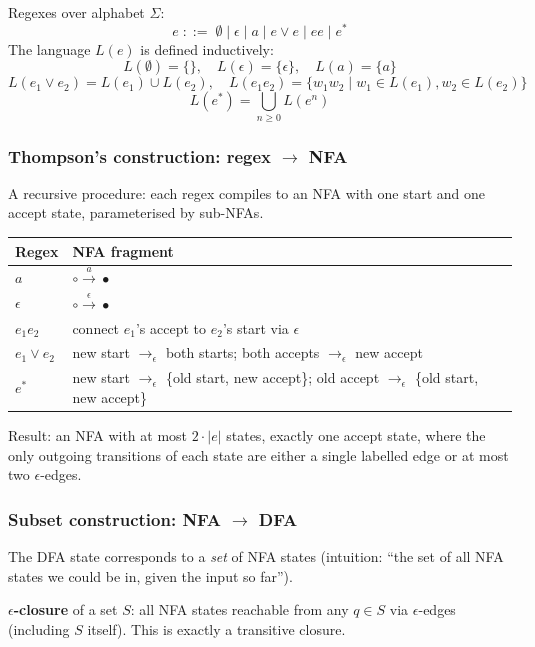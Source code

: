 \documentclass[11pt,a4paper]{article}
\begin{document}
Regexes over alphabet $\Sigma$:
$$e \;::=\; \emptyset \mid \epsilon \mid a \mid e \vee e \mid ee \mid e^*$$
The language $L(e)$ is defined inductively:
$$L(\emptyset) = \{\}, \quad L(\epsilon) = \{\epsilon\}, \quad L(a) = \{a\}$$
$$L(e_1 \vee e_2) = L(e_1) \cup L(e_2), \quad L(e_1 e_2) = \{w_1 w_2 \mid w_1 \in L(e_1), w_2 \in L(e_2)\}$$
$$L(e^*) = \bigcup_{n \geq 0} L(e^n)$$

\subsubsection*{Thompson's construction: regex $\to$ NFA}

A recursive procedure: each regex compiles to an NFA with one start and one accept state, parameterised by sub-NFAs.

\begin{center}
\begin{tabular}{ll}
\hline
Regex & NFA fragment \\
\hline
$a$           & $\circ \xrightarrow{a} \bullet$ \\
$\epsilon$    & $\circ \xrightarrow{\epsilon} \bullet$ \\
$e_1 e_2$     & connect $e_1$'s accept to $e_2$'s start via $\epsilon$ \\
$e_1 \vee e_2$ & new start $\to_\epsilon$ both starts; both accepts $\to_\epsilon$ new accept \\
$e^*$         & new start $\to_\epsilon$ \{old start, new accept\}; old accept $\to_\epsilon$ \{old start, new accept\} \\
\hline
\end{tabular}
\end{center}

Result: an NFA with at most $2 \cdot |e|$ states, exactly one accept state, where the only outgoing transitions of each state are either a single labelled edge or at most two $\epsilon$-edges.

\subsubsection*{Subset construction: NFA $\to$ DFA}

The DFA state corresponds to a \emph{set} of NFA states (intuition: ``the set of all NFA states we could be in, given the input so far'').

\textbf{$\epsilon$-closure} of a set $S$: all NFA states reachable from any $q \in S$ via $\epsilon$-edges (including $S$ itself). This is exactly a transitive closure.
\end{document}

